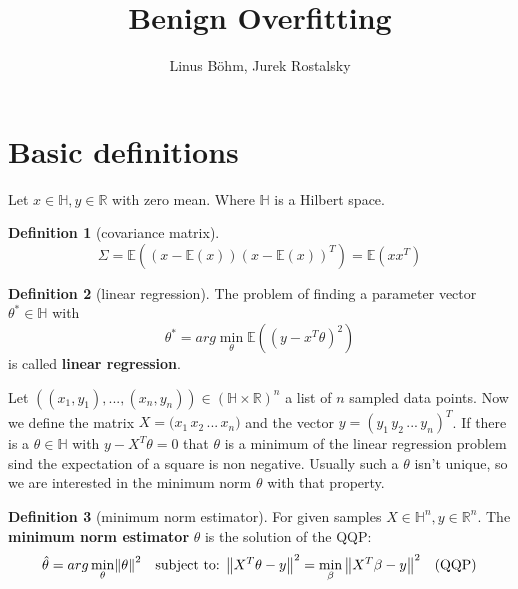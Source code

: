 \documentclass[a4paper,12pt]{scrartcl}
\author{\normalsize Linus Böhm, Jurek Rostalsky}
\title{Benign Overfitting}
\date{}
\theoremstyle{definition}
\newtheorem{definition}{Definition}[section]
\begin{document}
\maketitle
\section{Basic definitions} \label{sec:basic_definitions}
Let \(x \in \mathbb{H}, y \in \mathbb{R}\) with zero mean. Where \(\mathbb{H}\) is a Hilbert space.

\begin{definition} [covariance matrix]
	\label{def:covarianvce_matrix}
	\begin{equation}
		\Sigma = \mathbb{E}\left(\left(x - \mathbb{E}(x)\right)\left(x - \mathbb{E}(x)\right)^T\right) =  \mathbb{E}(xx^T)
	\end{equation} 
\end{definition}

\begin{definition} [linear regression]
	\label{def:linear_regression}
	The problem of finding a parameter vector \(\theta^\ast \in \mathbb{H}\) with
	\begin{equation}
		\theta^\ast = arg \min\limits_\theta \mathbb{E}\left((y - x^T \theta)^2\right)
	\end{equation}
	is called \textbf{linear regression}.
\end{definition}

Let \(\left((x_1, y_1), ..., (x_n, y_n)\right) \in (\mathbb{H} \times \mathbb{R})^n\) a list of \(n\) sampled data points. Now we define the matrix \(X = \big(x_1 \, x_2 \, ... \, x_n\big)\) and the vector \(y = (y_1 \, y_2 \, ... \, y_n)^T\). If there is a \(\theta \in \mathbb{H}\) with \(y - X^T \theta = 0\) that \(\theta\) is a minimum of the linear regression problem sind the expectation of a square is non negative. Usually such a \(\theta\) isn't unique, so we are interested in the minimum norm \(\theta\) with that property.

\begin{definition}[minimum norm estimator]
	For given samples \(X \in \mathbb{H}^n, y \in \mathbb{R}^n\). The \textbf{minimum norm estimator} \(\theta\) is the solution of the QQP:
		\begin{align*}
			\label{eq:QQP}
			\hat{\theta} = arg \min\limits_{\theta} &\norm{\theta}^2 & \text{subject to: } \norm{X^T \theta - y}^2 = \min\limits_\beta \norm{X^T \beta - y}^2 && \text{(QQP)}\\
		\end{align*}		
\end{definition}
\end{document}
